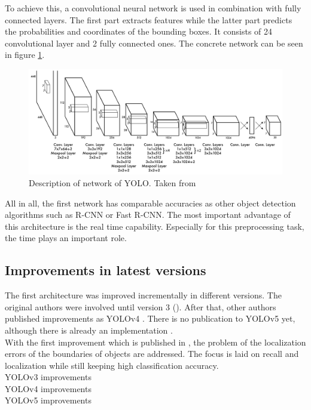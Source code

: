 To achieve this, a convolutional neural network is used in combination with fully connected layers. The first part extracts features while the latter part predicts the probabilities and coordinates of the bounding boxes. It consists of 24 convolutional layer and 2 fully connected ones. The concrete network can be seen in figure \ref{fig:YOLO_network}. \\


\begin{figure}[htb!]
	\centering
	\includegraphics[scale=0.28]{figures/YOLO_network.png}
	\caption{Description of network of YOLO. Taken from \cite{yolov1}}
	\label{fig:YOLO_network}
\end{figure}

All in all, the first network has comparable accuracies as other object detection algorithms such as R-CNN or Fast R-CNN. The most important advantage of this architecture is the real time capability. Especially for this preprocessing task, the time plays an important role. 

\subsection{Improvements in latest versions}

The first architecture was improved incrementally in different versions. The original authors were involved until version 3 (\cite{yolov1, yolov2, yolov3}). After that, other authors published improvements as YOLOv4 \cite{yolov4}. There is no publication to YOLOv5 yet, although there is already an implementation \cite{yolov5}. \\

With the first improvement which is published in \cite{yolov2}, the problem of the localization errors of the boundaries of objects are addressed. The focus is laid on recall and localization while still keeping high classification accuracy.  \\

YOLOv3 improvements  \\

YOLOv4 improvements  \\
 
YOLOv5 improvements  \\
